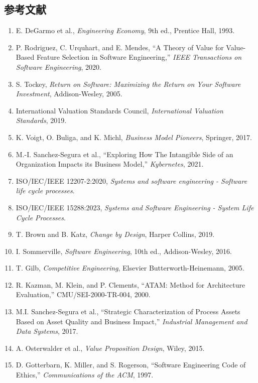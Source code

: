 \subsection{参考文献}

\begin{enumerate}
  \item E. DeGarmo et al., \textit{Engineering Economy}, 9th ed., Prentice Hall, 1993.
  \item P. Rodriguez, C. Urquhart, and E. Mendes, ``A Theory of Value for Value-Based Feature Selection in Software Engineering,'' \textit{IEEE Transactions on Software Engineering}, 2020.
  \item S. Tockey, \textit{Return on Software: Maximizing the Return on Your Software Investment}, Addison-Wesley, 2005.
  \item International Valuation Standards Council, \textit{International Valuation Standards}, 2019.
  \item K. Voigt, O. Buliga, and K. Michl, \textit{Business Model Pioneers}, Springer, 2017.
  \item M.-I. Sanchez-Segura et al., ``Exploring How The Intangible Side of an Organization Impacts its Business Model,'' \textit{Kybernetes}, 2021.
  \item ISO/IEC/IEEE 12207-2:2020, \textit{Systems and software engineering - Software life cycle processes}.
  \item ISO/IEC/IEEE 15288:2023, \textit{Systems and Software Engineering - System Life Cycle Processes}.
  \item T. Brown and B. Katz, \textit{Change by Design}, Harper Collins, 2019.
  \item I. Sommerville, \textit{Software Engineering}, 10th ed., Addison-Wesley, 2016.
  \item T. Gilb, \textit{Competitive Engineering}, Elsevier Butterworth-Heinemann, 2005.
  \item R. Kazman, M. Klein, and P. Clements, ``ATAM: Method for Architecture Evaluation,'' CMU/SEI-2000-TR-004, 2000.
  \item M.I. Sanchez-Segura et al., ``Strategic Characterization of Process Assets Based on Asset Quality and Business Impact,'' \textit{Industrial Management and Data Systems}, 2017.
  \item A. Osterwalder et al., \textit{Value Proposition Design}, Wiley, 2015.
  \item D. Gotterbarn, K. Miller, and S. Rogerson, ``Software Engineering Code of Ethics,'' \textit{Communications of the ACM}, 1997.

\end{enumerate}
